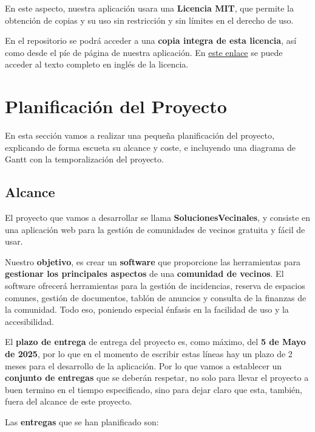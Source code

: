 En este aspecto, nuestra aplicación usara una \textbf{Licencia MIT}, que permite la obtención de copias y su uso sin restricción y sin límites en el derecho de uso. \cite{mit}

En el repositorio se podrá acceder a una \textbf{copia integra de esta licencia}, así como desde el píe de página de nuestra aplicación. En \href{https://opensource.org/license/mit}{este enlace} se puede acceder al texto completo en inglés de la licencia.

\section{Planificación del Proyecto}
En esta sección vamos a realizar una pequeña planificación del proyecto, explicando de forma escueta su alcance y coste, e incluyendo una diagrama de Gantt con la temporalización del proyecto.

\subsection{Alcance}
El proyecto que vamos a desarrollar se llama \textbf{SolucionesVecinales}, y consiste en una aplicación web para la gestión de comunidades de vecinos gratuita y fácil de usar.

Nuestro \textbf{objetivo}, es crear un \textbf{software} que proporcione las herramientas para \textbf{gestionar los principales aspectos} de una \textbf{comunidad de vecinos}. El software ofrecerá herramientas para la gestión de incidencias, reserva de espacios comunes, gestión de documentos, tablón de anuncios y consulta de la finanzas de la comunidad. Todo eso, poniendo especial énfasis en la facilidad de uso y la accesibilidad.

El \textbf{plazo de entrega} de entrega del proyecto es, como máximo, del \textbf{5 de Mayo de 2025}, por lo que en el momento de escribir estas líneas hay un plazo de 2 meses para el desarrollo de la aplicación. Por lo que vamos a establecer un \textbf{conjunto de entregas} que se deberán respetar, no solo para llevar el proyecto a buen termino en el tiempo especificado, sino para dejar claro que esta, también, fuera del alcance de este proyecto.

Las \textbf{entregas} que se han planificado son:

